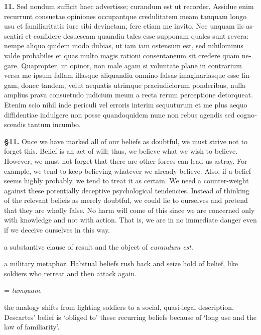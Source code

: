 \clearpage

\beginnumbering
\pstart
\begin{latin}
    \textenglish{\textbf{11.}} Sed nondum sufficit haec advertisse; curandum est ut recorder. Assidue enim recurrunt consuetae opiniones occupantque credulitatem meam tanquam longo usu et familiaritatis iure sibi devinctam, fere etiam me invito. Nec unquam iis assentiri et confidere desuescam quamdiu tales esse supponam quales sunt revera: nempe aliquo quidem modo dubias, ut iam iam ostensum est, sed nihilominus valde probabiles et quas multo magis rationi consentaneum sit credere quam negare. Quapropter, ut opinor, non male agam si voluntate plane in contrarium versa me ipsum fallam illasque aliquandiu omnino falsas imaginariasque esse fingam, donec tandem, velut aequatis utrimque praeiudiciorum ponderibus, nulla amplius prava consuetudo iudicium meum a recta rerum perceptione detorqueat. Etenim scio nihil inde periculi vel erroris interim sequuturum et me plus aequo diffidentiae indulgere non posse quandoquidem nunc non rebus agendis sed cognoscendis tantum incumbo.
\end{latin}
\pend
\endnumbering

\prenotes

\textbf{§11.} Once we have marked all of our beliefs as doubtful, we must strive not to forget this. Belief is an act of will; thus, we believe what we wish to believe. However, we must not forget that there are other forces can lead us astray. For example, we tend to keep believing whatever we already believe. Also, if a belief seems highly probably, we tend to treat it as certain. We need a counter-weight against these potentially deceptive psychological tendencies. Instead of thinking of the relevant beliefs as merely doubtful, we could lie to ourselves and pretend that they are wholly false. No harm will come of this since we are concerned only with knowledge and not with action. That is, we are in no immediate danger even if we deceive ourselves in this way.

 a substantive clause of result and the object of \textit{curandum est}.

 a military metaphor. Habitual beliefs rush back and seize hold of belief, like soldiers who retreat and then attack again.

 = \textit{tamquam}. 

 the analogy shifts from fighting soldiers to a social, quasi-legal description. Descartes' belief is `obliged to' these recurring beliefs because of `long use and the law of familiarity'.

